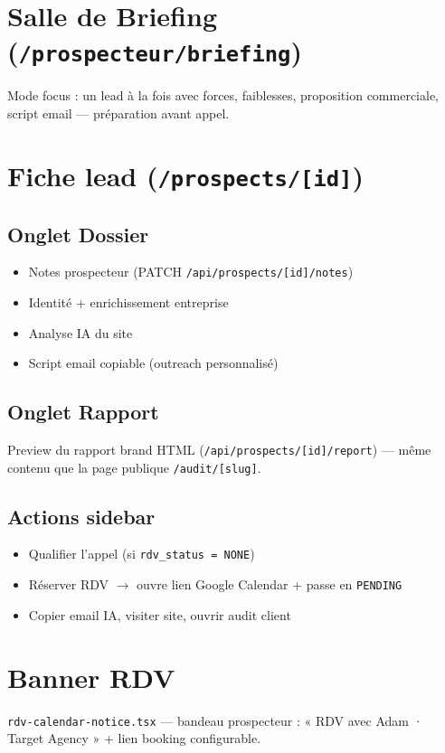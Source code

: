 \documentclass[11pt,a4paper]{report}
\begin{document}
\section{Salle de Briefing (\texttt{/prospecteur/briefing})}

Mode focus : un lead à la fois avec forces, faiblesses, proposition commerciale, script email --- préparation avant appel.

\section{Fiche lead (\texttt{/prospects/[id]})}

\subsection{Onglet Dossier}
\begin{itemize}[noitemsep]
  \item Notes prospecteur (PATCH \texttt{/api/prospects/[id]/notes})
  \item Identité + enrichissement entreprise
  \item Analyse IA du site
  \item Script email copiable (outreach personnalisé)
\end{itemize}

\subsection{Onglet Rapport}
Preview du rapport brand HTML (\texttt{/api/prospects/[id]/report}) --- même contenu que la page publique \texttt{/audit/[slug]}.

\subsection{Actions sidebar}
\begin{itemize}[noitemsep]
  \item Qualifier l'appel (si \texttt{rdv\_status = NONE})
  \item Réserver RDV $\rightarrow$ ouvre lien Google Calendar + passe en \texttt{PENDING}
  \item Copier email IA, visiter site, ouvrir audit client
\end{itemize}

\section{Banner RDV}
\texttt{rdv-calendar-notice.tsx} --- bandeau prospecteur : « RDV avec Adam · Target Agency » + lien booking configurable.
\end{document}
